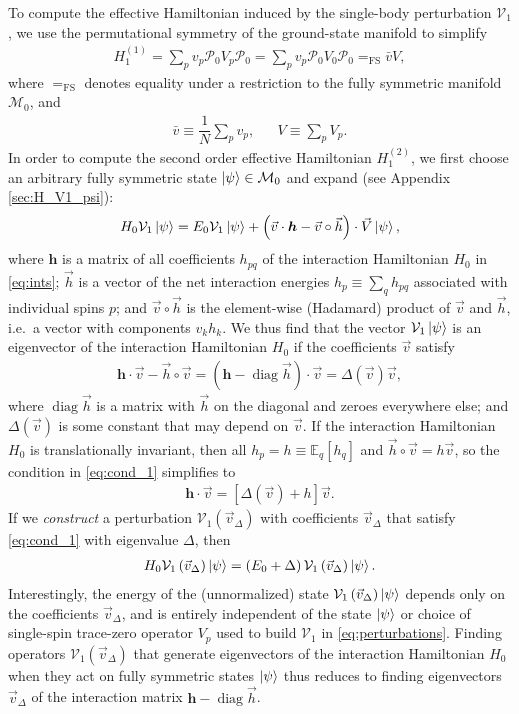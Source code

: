 \documentclass[nofootinbib,notitlepage,11pt]{revtex4-2}
\newcommand{\f}[2]{\dfrac{#1}{#2}} %
\newcommand{\p}[1]{\left(#1\right)} %
\renewcommand{\sp}[1]{\left[#1\right]} %
\renewcommand{\c}{\cdot} %
\renewcommand{\oc}{\circ} %
\newcommand{\m}{\bm} %
\renewcommand{\v}{\vec} %
\newcommand{\1}{\mathds{1}}
\newcommand{\M}{\mathcal{M}}
\renewcommand{\P}{\mathcal{P}}
\newcommand{\V}{\mathcal{V}}
\newcommand{\EE}{\mathbb{E}}
\newcommand{\FSEQ}{=_{\text{FS}}}
\DeclareMathOperator{\diag}{diag}
\begin{document}
To compute the effective Hamiltonian induced by the single-body
perturbation $\V_1$, we use the permutational symmetry of the
ground-state manifold to simplify
\begin{align}
  H_1^{(1)} = \sum_p v_p \P_0 V_p \P_0
  = \sum_p v_p \P_0 V_0 \P_0 \FSEQ \bar v V,
  \label{eq:H_1_1}
\end{align}
where $\FSEQ$ denotes equality under a restriction to the fully
symmetric manifold $\M_0$, and
\begin{align}
  \bar v \equiv \f1N \sum_p v_p,
  &&
  V \equiv \sum_p V_p.
\end{align}
In order to compute the second order effective Hamiltonian
$H_1^{(2)}$, we first choose an arbitrary fully symmetric state
$\ket\psi\in\M_0$ and expand (see Appendix \ref{sec:H_V1_psi}):
\begin{align}
  H_0 \V_1 \ket\psi
  = E_0 \V_1 \ket\psi
  + \p{\v v\c\m h - \v v\oc\v h}\c \v V \ket\psi,
  \label{eq:H_V1_psi_start}
\end{align}
where $\m h$ is a matrix of all coefficients $h_{pq}$ of the
interaction Hamiltonian $H_0$ in \eqref{eq:ints}; $\v h$ is a vector
of the net interaction energies $h_p\equiv\sum_qh_{pq}$ associated
with individual spins $p$; and $\v v\oc\v h$ is the element-wise
(Hadamard) product of $\v v$ and $\v h$, i.e.~a vector with components
$v_kh_k$.  We thus find that the vector $\V_1\ket\psi$ is an
eigenvector of the interaction Hamiltonian $H_0$ if the coefficients
$\v v$ satisfy
\begin{align}
  \m h \c \v v - \v h\oc\v v
  = \p{\m h - \diag\v h}\c\v v
  = \Delta\p{\v v} \v v,
  \label{eq:cond_1}
\end{align}
where $\diag\v h$ is a matrix with $\v h$ on the diagonal and zeroes
everywhere else; and $\Delta\p{\v v}$ is some constant that may depend
on $\v v$.  If the interaction Hamiltonian $H_0$ is translationally
invariant, then all $h_p=h\equiv\EE_q\sp{h_q}$ and
$\v h\oc\v v=h\v v$, so the condition in \eqref{eq:cond_1} simplifies
to
\begin{align}
  \m h \c\v v = \sp{\Delta\p{\v v}+h} \v v.
\end{align}
If we {\it construct} a perturbation $\V_1\p{\v v_\Delta}$ with
coefficients $\v v_\Delta$ that satisfy \eqref{eq:cond_1} with
eigenvalue $\Delta$, then
\begin{align}
  H_0 \V_1\p{\v v_\Delta} \ket\psi
  = \p{E_0 + \Delta} \V_1\p{\v v_\Delta} \ket\psi.
  \label{eq:H_V1_psi}
\end{align}
Interestingly, the energy of the (unnormalized) state
$\V_1\p{\v v_\Delta}\ket\psi$ depends only on the coefficients
$\v v_\Delta$, and is entirely independent of the state $\ket\psi$ or
choice of single-spin trace-zero operator $V_p$ used to build $\V_1$
in \eqref{eq:perturbations}.  Finding operators $\V_1\p{\v v_\Delta}$
that generate eigenvectors of the interaction Hamiltonian $H_0$ when
they act on fully symmetric states $\ket\psi$ thus reduces to finding
eigenvectors $\v v_\Delta$ of the interaction matrix $\m h-\diag\v h$.
\end{document}
